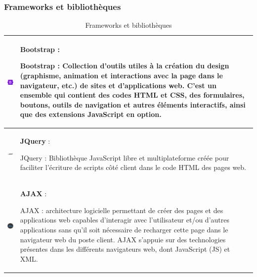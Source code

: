 \documentclass{article}
\begin{document}
            \subsubsection{Frameworks et bibliothèques}
                \begin{table}[h!]
                    \centering
                    \begin{tabular}{|m{2cm}|m{12cm}|}
                        \hline
                        \includegraphics[width=2cm]{assets/logos/OIP (1).jpg} &
                        \textbf{Bootstrap} :
                        
                        Bootstrap : Collection d'outils utiles à la création du design (graphisme, animation et interactions avec la page dans le navigateur, etc.) de sites et d'applications web. C'est un ensemble qui contient des codes HTML et CSS, des formulaires, boutons, outils de navigation et autres éléments interactifs, ainsi que des extensions JavaScript en option. \\
                        \hline
                        \includegraphics[width=2cm]{assets/logos/jq.png} &
                        \textbf{JQuery} :
                        
                        JQuery : Bibliothèque JavaScript libre et multiplateforme créée pour faciliter l'écriture de scripts côté client dans le code HTML des pages web. \\
                        \hline
                        \includegraphics[width=2cm]{assets/logos/ajax.png} &
                        \textbf{AJAX} :
                        
                        AJAX : architecture logicielle permettant de créer des pages et des applications web capables d'interagir avec l'utilisateur et/ou d'autres applications sans qu'il soit nécessaire de recharger cette page dans le navigateur web du poste client. AJAX s'appuie sur des technologies présentes dans les différents navigateurs web, dont JavaScript (JS) et XML. \\
                        \hline
                    \end{tabular}
                    \caption{Frameworks et bibliothèques}
                \end{table}
            \FloatBarrier
\end{document}

